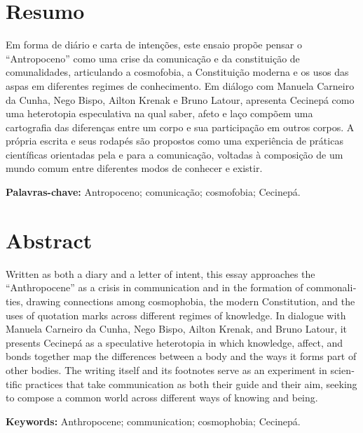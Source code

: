 \section*{Resumo}
Em forma de diário e carta de intenções, este ensaio propõe pensar o \enquote{Antropoceno} como uma crise da comunicação e da constituição de comunalidades, articulando a cosmofobia, a Constituição moderna e os usos das aspas em diferentes regimes de conhecimento. Em diálogo com Manuela Carneiro da Cunha, Nego Bispo, Ailton Krenak e Bruno Latour, apresenta Cecinepá como uma heterotopia especulativa na qual saber, afeto e laço compõem uma cartografia das diferenças entre um corpo e sua participação em outros corpos. A própria escrita e seus rodapés são propostos como uma experiência de práticas científicas orientadas pela e para a comunicação, voltadas à composição de um mundo comum entre diferentes modos de conhecer e existir.

\noindent\textbf{Palavras-chave:} Antropoceno; comunicação; cosmofobia; Cecinepá.

\section*{Abstract}
\begin{otherlanguage}{english}
Written as both a diary and a letter of intent, this essay approaches the \enquote{Anthropocene} as a crisis in communication and in the formation of commonalities, drawing connections among cosmophobia, the modern Constitution, and the uses of quotation marks across different regimes of knowledge. In dialogue with Manuela Carneiro da Cunha, Nego Bispo, Ailton Krenak, and Bruno Latour, it presents Cecinepá as a speculative heterotopia in which knowledge, affect, and bonds together map the differences between a body and the ways it forms part of other bodies. The writing itself and its footnotes serve as an experiment in scientific practices that take communication as both their guide and their aim, seeking to compose a common world across different ways of knowing and being.

\noindent\textbf{Keywords:} Anthropocene; communication; cosmophobia; Cecinepá.
\end{otherlanguage}
